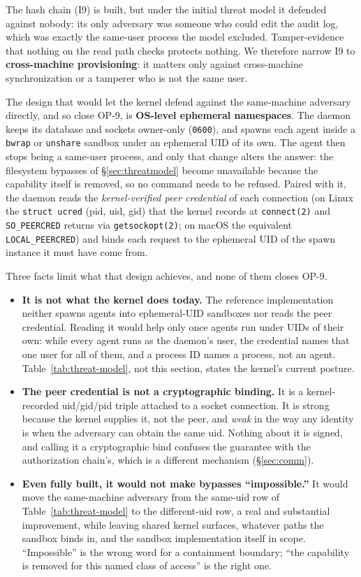 \documentclass[11pt,a4paper]{article}
\theoremstyle{definition}
\theoremstyle{remark}
\begin{document}
The hash chain (I9) is built, but under the initial threat model it defended
against nobody: its only adversary was someone who could edit the audit log, which was
exactly the same-user process the model excluded. Tamper-evidence that nothing on
the read path checks protects nothing. We therefore narrow I9 to
\textbf{cross-machine provisioning}: it matters only against cross-machine
synchronization or a tamperer who is not the same user.

The design that would let the kernel defend against the same-machine adversary
directly, and so close OP-9, is \textbf{OS-level ephemeral namespaces}. The daemon keeps its database and sockets owner-only
(\texttt{0600}), and spawns each agent inside a \texttt{bwrap} or \texttt{unshare}
sandbox under an ephemeral UID of its own. The agent then stops being a same-user
process, and only that change alters the answer: the filesystem bypasses of
\S\ref{sec:threatmodel} become unavailable because the capability itself is removed,
so no command needs to be refused. Paired with it, the daemon reads the
\emph{kernel-verified peer credential} of each connection (on Linux the
\texttt{struct ucred} (pid, uid, gid) that the kernel records at \texttt{connect(2)}
and \texttt{SO\_PEERCRED} returns via \texttt{getsockopt(2)}; on macOS the
equivalent \texttt{LOCAL\_PEERCRED}) and binds each request to the ephemeral UID
of the spawn instance it must have come from.

Three facts limit what that design achieves, and none of them closes OP-9.

\begin{itemize}[leftmargin=1.4em,itemsep=2pt]
  \item \textbf{It is not what the kernel does today.} The reference implementation
  neither spawns agents into ephemeral-UID sandboxes nor reads the peer
  credential. Reading it would help only once agents run under UIDs of their
  own: while every agent runs as the daemon's user, the credential names that
  one user for all of them, and a process ID names a process, not an agent.
  Table~\ref{tab:threat-model}, not this section, states the kernel's current
  posture.
  \item \textbf{The peer credential is not a cryptographic binding.} It is a
  kernel-recorded uid/gid/pid triple attached to a socket connection. It is strong
  because the kernel supplies it, not the peer, and \emph{weak} in the way any
  identity is when the adversary can obtain the same uid. Nothing about it
  is signed, and calling it a cryptographic bind confuses the guarantee with the
  authorization chain's, which is a different mechanism (\S\ref{sec:comm}).
  \item \textbf{Even fully built, it would not make bypasses ``impossible.''} It
  would move the same-machine adversary from the same-uid row of
  Table~\ref{tab:threat-model} to the different-uid row, a real and substantial
  improvement, while leaving shared kernel surfaces, whatever paths the sandbox
  binds in, and the sandbox implementation itself in scope. ``Impossible'' is the
  wrong word for a containment boundary; ``the capability is removed for this
  named class of access'' is the right one.
\end{itemize}
\end{document}
